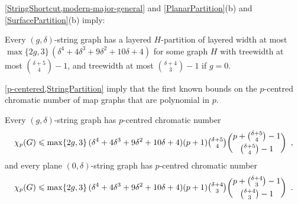 \documentclass{patmorin}
\newcommand{\PP}{\mathcal{P}}
\renewcommand{\le}{\leqslant}
\begin{document}
%

\cref{StringShortcut,modern-major-general} and \cref{PlanarPartition}(b) and \cref{SurfacePartition}(b) imply:

\begin{thm}
\label{StringPartition}
Every $(g,\delta)$-string graph has a layered $H$-partition of layered 
width at most $\max\{2g,3\} \,(\delta^4 + 4 \delta^3 + 9 \delta^2 + 10 \delta + 4)$ 
for some graph $H$ with treewidth at most $\binom{ \delta+5}{4}-1$, 
and treewidth at most $\binom{ \delta+4}{3}-1$ if $g=0$. 
%
%
%
\end{thm}


\cref{p-centered,StringPartition} imply that the first known bounds on the $p$-centred chromatic number of map graphs that are polynomial in $p$.

\begin{cor}
Every $(g,\delta)$-string graph has $p$-centred chromatic number  
$$\chi_p(G)\le \max\{2g,3\} \,(\delta^4 + 4 \delta^3 + 9 \delta^2 + 10 \delta + 4) (p+1) 
\tbinom{ \delta+5}{4} \binom{p+\binom{ \delta+5}{4}-1}{\binom{ \delta+5}{4}-1}\enspace,$$
and every plane $(0,\delta)$-string graph has $p$-centred chromatic number  
$$\chi_p(G)\le \max\{2g,3\} \,(\delta^4 + 4 \delta^3 + 9 \delta^2 + 10 \delta + 4) (p+1) 
\tbinom{ \delta+4}{3}\binom{p+\binom{ \delta+4}{3}-1}{\binom{ \delta+4}{3}-1}\enspace.$$
\end{cor}
\end{document}
